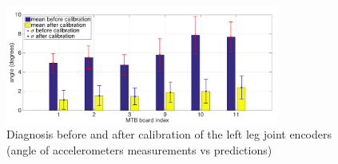 \begin{figure}[hb!]
  \centering
    \includegraphics[width=0.8\textwidth]{images/T42-selfCalibration-Diagnosis.png}
    \caption{Diagnosis before and after calibration of the left leg joint encoders (angle of accelerometers measurements vs predictions)}
    \label{fig:T4.2-selfCalibration-Diagnosis}
\end{figure}

